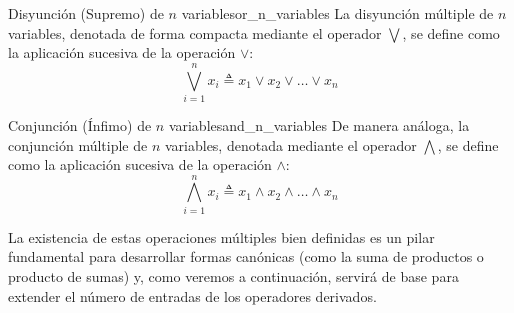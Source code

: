 \begin{definicion}{Disyunción (Supremo) de $n$ variables}{or_n_variables}
La disyunción múltiple de $n$ variables, denotada de forma compacta mediante el operador $\bigvee$, se define como la aplicación sucesiva de la operación $\vee$:
\[ \bigvee_{i=1}^n x_i \triangleq x_1 \vee x_2 \vee \dots \vee x_n \]
\end{definicion}

\begin{definicion}{Conjunción (Ínfimo) de $n$ variables}{and_n_variables}
De manera análoga, la conjunción múltiple de $n$ variables, denotada mediante el operador $\bigwedge$, se define como la aplicación sucesiva de la operación $\wedge$:
\[ \bigwedge_{i=1}^n x_i \triangleq x_1 \wedge x_2 \wedge \dots \wedge x_n \]
\end{definicion}

La existencia de estas operaciones múltiples bien definidas es un pilar fundamental para desarrollar formas canónicas (como la suma de productos o producto de sumas) y, como veremos a continuación, servirá de base para extender el número de entradas de los operadores derivados.


